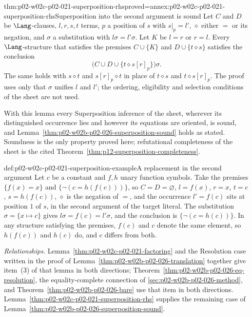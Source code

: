\begin{hblemma}{thm:p02-w02c-p02-021-superposition-rhs}{proved=annex:p02-w02c-p02-021-superposition-rhs}{Superposition into the second argument is sound}
Let \(C\) and \(D\) be \(\Lang\)-clauses, \(l,r,s,t\) terms, \(p\) a position
of \(s\) with \(s|_p=l'\), \(\diamond\) either \(=\) or its negation, and
\(\sigma\) a substitution with \(l\sigma=l'\sigma\).  Let \(K\) be \(l=r\) or
\(r=l\).  Every \(\Lang\)-structure that satisfies the premises
\(C\cup\{K\}\) and \(D\cup\{t\mathrel{\diamond}s\}\) satisfies the conclusion
\[
 \bigl(C\cup D\cup\{t\mathrel{\diamond}s[r]_p\}\bigr)\sigma .
\]
The same holds with \(s\mathrel{\diamond}t\) and \(s[r]_p\mathrel{\diamond}t\)
in place of \(t\mathrel{\diamond}s\) and \(t\mathrel{\diamond}s[r]_p\).  The
proof uses only that \(\sigma\) unifies \(l\) and \(l'\); the ordering,
eligibility and selection conditions of the sheet are not used.
\end{hblemma}

With this lemma every Superposition inference of the sheet, wherever its
distinguished occurrence lies and however its equations are oriented, is
sound, and Lemma~\ref{thm:p02-w02b-p02-026-superposition-sound} holds as
stated.  Soundness is the only property proved here; refutational
completeness of the sheet is the cited
Theorem~\ref{thm:p12-superposition-completeness}.

\begin{hbexample}{def:p02-w02c-p02-021-superposition-example}{A replacement in the second argument}
Let \(c\) be a constant and \(f,h\) unary function symbols.  Take the premises
\(\{f(x)=x\}\) and \(\{\neg(c=h(f(c)))\}\), so \(C=D=\varnothing\), \(l=f(x)\),
\(r=x\), \(t=c\), \(s=h(f(c))\), \(\diamond\) is the negation of \(=\), and the
occurrence \(l'=f(c)\) sits at position \(1\) of \(s\), in the second argument
of the target literal.  The substitution \(\sigma=\{x\mapsto c\}\) gives
\(l\sigma=f(c)=l'\sigma\), and the conclusion is
\(\{\neg(c=h(c))\}\).  In any structure satisfying the premises,
\(f(c)\) and \(c\) denote the same element, so \(h(f(c))\) and \(h(c)\) do,
and \(c\) differs from both.
\end{hbexample}

\emph{Relationships.}  Lemma~\ref{thm:p02-w02c-p02-021-factoring} and the
Resolution case written in the proof of
Lemma~\ref{thm:p02-w02b-p02-026-translation} together give item~(3) of that
lemma in both directions; Theorem~\ref{thm:p02-w02b-p02-026-eq-resolution},
the equality-complete connection of \cref{sec:p02-w02b-p02-026-method}, and
Theorem~\ref{thm:p02-w02b-p02-026-bare} use that item in both directions.
Lemma~\ref{thm:p02-w02c-p02-021-superposition-rhs} supplies the remaining case
of Lemma~\ref{thm:p02-w02b-p02-026-superposition-sound}.

